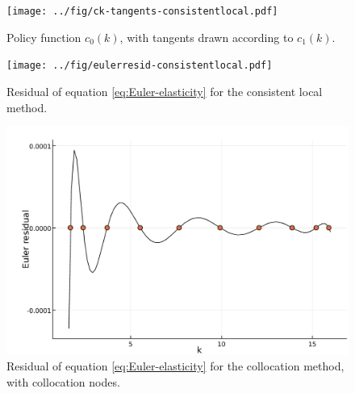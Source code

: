 \documentclass[a4paper,11pt]{article}
\newcommand{\figwidth}{\linewidth}
\begin{document}
\begin{figure}[b]
\begin{minipage}[t]{0.48\linewidth}
    \label{fig:cderiv-consistentlocal}
  \end{minipage}\hfill%
  \begin{minipage}[t]{0.48\linewidth}
    \texttt{[image: ../fig/ck-tangents-consistentlocal.pdf]}
    \caption{Policy function $c_0(k)$, with tangents drawn according to $c_1(k)$.}
    \label{fig:policy-tangents}
  \end{minipage}
  \begin{minipage}[t]{0.48\linewidth}
    \texttt{[image: ../fig/eulerresid-consistentlocal.pdf]}
    \caption{Residual of equation \eqref{eq:Euler-elasticity} for the consistent local method.}
    \label{fig:euler-residual-consistentlocal}
  \end{minipage}\hfill%
  \begin{minipage}[t]{0.48\linewidth}
    \includegraphics[width=\figwidth]{../fig/eulerresid-collocation.pdf}
    \caption{Residual of equation \eqref{eq:Euler-elasticity} for the collocation method, with collocation nodes.}
    \label{fig:eulerresid-collocation}
  \end{minipage}
\end{figure}
\end{document}
